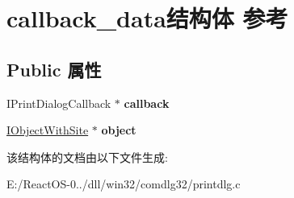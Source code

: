 \hypertarget{structcallback__data}{}\section{callback\+\_\+data结构体 参考}
\label{structcallback__data}
\subsection*{Public 属性}
\begin{DoxyCompactItemize}
\item 
\mbox{\label{structcallback__data_aeab7c88bc75d7786896096e98ec62182}} 
I\+Print\+Dialog\+Callback $\ast$ {\bfseries callback}
\item 
\mbox{\label{structcallback__data_afb058551b6f792f26f8d225bb2bf8c3d}} 
\hyperlink{interface_i_object_with_site}{I\+Object\+With\+Site} $\ast$ {\bfseries object}
\end{DoxyCompactItemize}


该结构体的文档由以下文件生成\+:\begin{DoxyCompactItemize}
\item 
E\+:/\+React\+O\+S-\/0../dll/win32/comdlg32/printdlg.\+c\end{DoxyCompactItemize}
